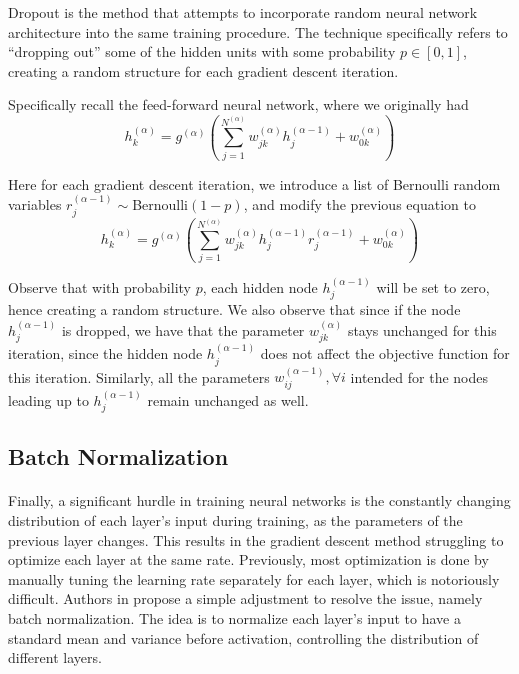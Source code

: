 Dropout is the method that attempts to incorporate 
random neural network architecture into 
the same training procedure.
The technique specifically refers to ``dropping out''
some of the hidden units with some probability $p \in [0,1]$,
creating a random structure for each gradient descent 
iteration.

Specifically recall the feed-forward neural network, 
where we originally had
%
\begin{equation*}
  h^{(\alpha)}_k = g^{(\alpha)}
    \left(\sum_{j=1}^{N^{(\alpha)}} w_{jk}^{(\alpha)} 
    h_j^{(\alpha-1)} + w^{(\alpha)}_{0k} \right)
\end{equation*}

Here for each gradient descent iteration,
we introduce a list of Bernoulli random variables
$r^{(\alpha-1)}_j \sim $Bernoulli$(1-p)$,
and modify the previous equation to
%
\begin{equation*}
  h^{(\alpha)}_k = g^{(\alpha)}
    \left(\sum_{j=1}^{N^{(\alpha)}} w_{jk}^{(\alpha)} 
    h_j^{(\alpha-1)} r_j^{(\alpha-1)}
     + w^{(\alpha)}_{0k} \right)
\end{equation*}

Observe that with probability $p$, 
each hidden node $h_j^{(\alpha-1)}$ will be set to zero,
hence creating a random structure.
We also observe that since if the node $h_j^{(\alpha-1)}$
is dropped, we have that the parameter 
$w_{jk}^{(\alpha)}$ stays unchanged for this iteration,
since the hidden node $h_j^{(\alpha-1)}$ does not 
affect the objective function for this iteration.
Similarly, all the parameters 
$w_{ij}^{(\alpha-1)},\forall i$ intended for 
the nodes leading up to $h_j^{(\alpha-1)}$ 
remain unchanged as well.














\subsection{Batch Normalization} \label{subsc:batch_norm}

\paragraph{}
Finally, a significant hurdle in training neural networks 
is the constantly changing distribution of each layer's
input during training, 
as the parameters of the previous layer changes.
This results in the gradient descent method struggling 
to optimize each layer at the same rate.
Previously, most optimization is done by 
manually tuning the learning rate separately 
for each layer, which is notoriously difficult.
Authors in \cite{IoSz15} propose a simple 
adjustment to resolve the issue, 
namely batch normalization.
The idea is to normalize each layer's input 
to have a standard mean and variance before activation,
controlling the distribution of different layers.

